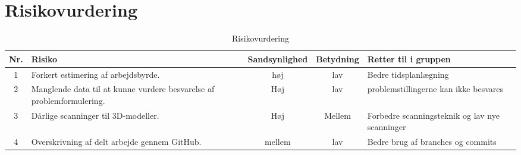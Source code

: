 \section{Risikovurdering}

\begin{table}[h!]
\centering
\begin{tabular}{|c|p{6cm}|c|c|p{4cm}|}
\hline
Nr. & Risiko & Sandsynlighed & Betydning & Retter til i gruppen \\ \hline

1 & Forkert estimering af arbejdsbyrde. 
& høj 
& lav 
& Bedre tidsplanlægning \\ \hline

2 & Manglende data til at kunne vurdere besvarelse af problemformulering. 
& Høj 
& lav 
& problemstillingerne kan ikke besvares\\ \hline

3 & Dårlige scanninger til 3D-modeller. 
& Høj 
& Mellem 
& Forbedre scanningsteknik og lav nye scanninger \\ \hline

4 & Overskrivning af delt arbejde gennem GitHub. 
& mellem
& lav 
& Bedre brug af branches og commits \\ \hline

\end{tabular}

\caption{Risikovurdering}
\label{tab:risici}
\end{table}